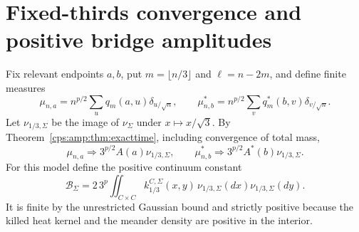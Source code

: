 \documentclass[11pt,letterpaper]{article}
\numberwithin{equation}{section}
\theoremstyle{remark}\newtheorem{remark}[theorem]{Remark}
\begin{document}
\section{Fixed-thirds convergence and positive bridge amplitudes}\label{cps:amp:sec:bridge}
Fix relevant endpoints $a,b$, put $m=\lfloor n/3\rfloor$ and $\ell=n-2m$, and define finite measures
\begin{equation}\label{cps:amp:eq:measures}
 \mu_{n,a}=n^{p/2}\sum_uq_m(a,u)\delta_{u/\sqrt n},\qquad
 \mu_{n,b}^*=n^{p/2}\sum_vq_m^*(b,v)\delta_{v/\sqrt n}.
\end{equation}
Let $\nu_{1/3,\Sigma}$ be the image of $\nu_\Sigma$ under $x\mapsto x/\sqrt3$. By Theorem~\ref{cps:amp:thm:exacttime}, including convergence of total mass,
\begin{equation}\label{cps:amp:eq:measurelimit}
 \mu_{n,a}\Longrightarrow3^{p/2}A(a)\nu_{1/3,\Sigma},\qquad
 \mu_{n,b}^*\Longrightarrow3^{p/2}A^*(b)\nu_{1/3,\Sigma}.
\end{equation}
For this model define the positive continuum constant
\begin{equation}\label{cps:amp:eq:B}
 \mathcal B_\Sigma
 =2\,3^p\iint_{C\times C}k_{1/3}^{C,\Sigma}(x,y)
       \,\nu_{1/3,\Sigma}(dx)\nu_{1/3,\Sigma}(dy).
\end{equation}
It is finite by the unrestricted Gaussian bound and strictly positive because the killed heat kernel and the meander density are positive in the interior.
\end{document}
